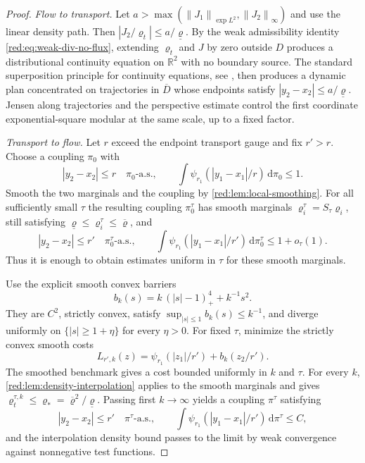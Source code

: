 \documentclass[11pt]{article}
\theoremstyle{definition}
\theoremstyle{remark}
\numberwithin{equation}{section}
\newcommand{\R}{\mathbb R}
\newcommand{\norm}[1]{\left\|#1\right\|}
\newcommand{\dd}{\,\mathrm d}
\begin{document}
\begin{proof}
\emph{Flow to transport.}
Let $a>\max(\norm{J_1}_{\exp L^2},\norm{J_2}_\infty)$ and use the linear
density path.  Then $|J_2/\varrho_t|\le a/\underline\varrho$.  By the weak admissibility identity
\eqref{red:eq:weak-div-no-flux}, extending $\varrho_t$ and $J$ by zero outside $D$
produces a distributional continuity equation on $\R^2$ with no boundary
source.  The standard superposition principle for continuity equations, see
\cite{AGS}, then
produces a dynamic plan concentrated on trajectories in $\overline D$ whose
endpoints satisfy
$|y_2-x_2|\le a/\underline\varrho$.  Jensen along trajectories and the perspective estimate
control the first coordinate exponential-square modular at the same scale,
up to a fixed factor.

\emph{Transport to flow.}
Let $r$ exceed the endpoint transport gauge and fix $r'>r$.  Choose a
coupling $\pi_0$ with
\[
 |y_2-x_2|\le r\quad\pi_0\text{-a.s.},
 \qquad
 \int\psi_{r_1}(|y_1-x_1|/r)\dd\pi_0\le1.
\]
Smooth the two marginals and the coupling by
\cref{red:lem:local-smoothing}.  For all sufficiently small $\tau$ the
resulting coupling $\pi_0^\tau$ has smooth marginals
$\varrho_i^\tau=S_\tau\varrho_i$, still satisfying $\underline\varrho\le\varrho_i^\tau\le\overline\varrho$,
and
\[
 |y_2-x_2|\le r'\quad\pi_0^\tau\text{-a.s.},
 \qquad
 \int\psi_{r_1}(|y_1-x_1|/r')\dd\pi_0^\tau\le 1+o_\tau(1).
\]
Thus it is enough to obtain estimates uniform in $\tau$ for these smooth
marginals.

Use the explicit smooth convex barriers
\[
 b_k(s)=k\,(|s|-1)_+^4+k^{-1}s^2.
\]
They are $C^2$, strictly convex, satisfy
$\sup_{|s|\le1}b_k(s)\le k^{-1}$, and diverge uniformly on
$\{|s|\ge1+\eta\}$ for every $\eta>0$.  For fixed $\tau$, minimize the
strictly convex smooth costs
\[
 L_{r',k}(z)=\psi_{r_1}(|z_1|/r')+b_k(z_2/r').
\]
The smoothed benchmark gives a cost bounded uniformly in $k$ and $\tau$.
For every $k$, \cref{red:lem:density-interpolation} applies to the smooth
marginals and gives
$\varrho_t^{\tau,k}\le\varrho_*=\overline\varrho^2/\underline\varrho$.  Passing first $k\to\infty$ yields
a coupling $\pi^\tau$ satisfying
\[
 |y_2-x_2|\le r'\quad\pi^\tau\text{-a.s.},
 \qquad
 \int\psi_{r_1}(|y_1-x_1|/r')\dd\pi^\tau\le C,
\]
and the interpolation density bound passes to the limit by weak convergence
against nonnegative test functions.


\end{proof}
\end{document}
